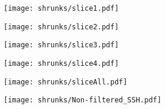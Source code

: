 \begin{frame}
\begin{figure}
	\centering
	\texttt{[image: shrunks/slice1.pdf]}
\end{figure}
\end{frame}

\begin{frame}
\begin{figure}
	\centering
	\texttt{[image: shrunks/slice2.pdf]}
\end{figure}
\end{frame}

\begin{frame}
\begin{figure}
	\centering
	\texttt{[image: shrunks/slice3.pdf]}
\end{figure}
\end{frame}

\begin{frame}
\begin{figure}
	\centering
	\texttt{[image: shrunks/slice4.pdf]}
\end{figure}
\end{frame}

\begin{frame}
\begin{figure}
	\centering
	\texttt{[image: shrunks/sliceAll.pdf]}
\end{figure}
\end{frame}

\begin{frame}
\begin{figure}
	\centering
	\texttt{[image: shrunks/Non-filtered\_SSH.pdf]}
\end{figure}
\end{frame}

